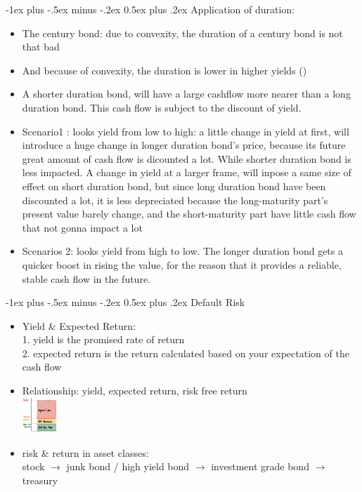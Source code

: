 \documentclass[10pt,landscape]{article}
\makeatletter
\renewcommand{\section}{\@startsection{section}{1}{0mm}%
                                {-1ex plus -.5ex minus -.2ex}%
                                {0.5ex plus .2ex}%
                                {\normalfont\large\bfseries}}
\makeatother
\begin{document}
\begin{multicols}{2}
    \section{\color{black}Application of duration:}
    \begin{itemize}
        \item The century bond: due to convexity, the duration of a century bond is not that bad
        \item And because of convexity, the duration is lower in higher yields ()
        \item A shorter duration bond, will have a large cashflow more nearer than a long duration bond. This cash flow is subject to the discount of yield.
        \item Scenario1 : looks yield from low to high: a little change in yield at first, will introduce a huge change in longer duration bond’s price, because its future great amount of cash flow is dicounted a lot. While shorter duration bond is less impacted. A change in yield at a larger frame, will inpose a same size of effect on short duration bond, but since long duration bond have been discounted a lot, it is less depreciated because the long-maturity part’s present value barely change, and the short-maturity part have little cash flow that not gonna impact a lot
        \item Scenarios 2: looks yield from high to low. The longer duration bond gets a quicker boost in rising the value, for the reason that it provides a reliable, stable cash flow in the future.
    \end{itemize}


    \section{\color{black}Default Risk}
    \begin{itemize}
        \item Yield \& Expected Return: \\
        1. yield is the promised rate of return\\
        2. expected return is the return calculated based on your expectation of the cash flow
        \item Relationship: yield, expected return, risk free return\\
            \includegraphics[width=0.1\textwidth]{yield-expected_return-risk_free_return}
        \item risk \& return in asset classes:\\
            stock $\rightarrow$ junk bond / high yield bond $\rightarrow$ investment grade bond $\rightarrow$ treasury
    \end{itemize}

    



	\end{multicols}
\end{document}
